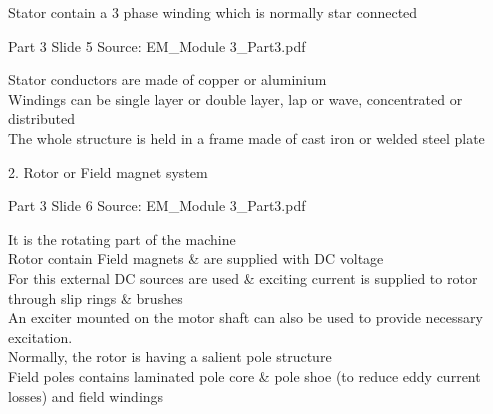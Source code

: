 \documentclass[11pt,a4paper]{article}
\begin{document}
\begin{mdframed}[roundcorner=9pt,backgroundcolor=white,linecolor=anthBlue,linewidth=1pt,innerleftmargin=12pt,innerrightmargin=12pt,innertopmargin=10pt,innerbottommargin=10pt,skipabove=8pt,skipbelow=10pt]
{\HeadingFont\fontsize{15}{18}\selectfont\color{anthDark}Stator contain a 3 phase winding which is normally star connected\par}
{\color{anthMid}\small Part 3 \textbullet{} Slide 5 \textbullet{} Source: EM\_Module 3\_Part3.pdf\par}
\vspace{0.5em}
{\small
\textcolor{anthBlue}{\textbullet}\hspace{0.65em}Stator conductors are made of copper or aluminium\\
\textcolor{anthBlue}{\textbullet}\hspace{0.65em}Windings can be single layer or double layer, lap or wave, concentrated or distributed\\
\textcolor{anthBlue}{\textbullet}\hspace{0.65em}The whole structure is held in a frame made of cast iron or welded steel plate\\

}
\end{mdframed}

\begin{mdframed}[roundcorner=9pt,backgroundcolor=white,linecolor=anthGreen,linewidth=1pt,innerleftmargin=12pt,innerrightmargin=12pt,innertopmargin=10pt,innerbottommargin=10pt,skipabove=8pt,skipbelow=10pt]
{\HeadingFont\fontsize{15}{18}\selectfont\color{anthDark}2. Rotor or Field magnet system\par}
{\color{anthMid}\small Part 3 \textbullet{} Slide 6 \textbullet{} Source: EM\_Module 3\_Part3.pdf\par}
\vspace{0.5em}
{\small
\textcolor{anthGreen}{\textbullet}\hspace{0.65em}It is the rotating part of the machine\\
\textcolor{anthGreen}{\textbullet}\hspace{0.65em}Rotor contain Field magnets \& are supplied with DC voltage\\
\textcolor{anthGreen}{\textbullet}\hspace{0.65em}For this external DC sources are used \& exciting current is supplied to rotor through slip rings \& brushes\\
\textcolor{anthGreen}{\textbullet}\hspace{0.65em}An exciter mounted on the motor shaft can also be used to provide necessary excitation.\\
\textcolor{anthGreen}{\textbullet}\hspace{0.65em}Normally, the rotor is having a salient pole structure\\
\textcolor{anthGreen}{\textbullet}\hspace{0.65em}Field poles contains laminated pole core \& pole shoe (to reduce eddy current losses) and field windings\\

}
\end{mdframed}
\end{document}
